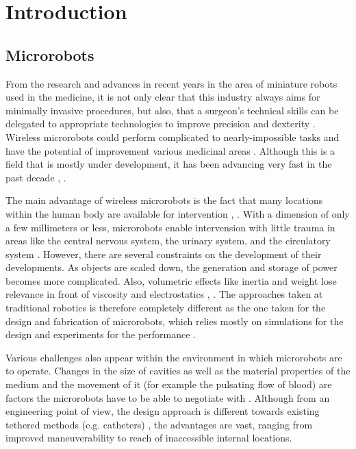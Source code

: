 \section{Introduction}
\label{s:Introduction}

\subsection{Microrobots}
From the research and advances in recent years in the area of miniature robots used in the medicine, it is not only clear that this industry always aims for minimally invasive procedures, but also, that a surgeon's technical skills can be delegated to appropriate technologies to improve precision and dexterity \cite{Hamdorf2000a}. Wireless microrobots could perform complicated to nearly-impossible tasks and have the potential of improvement various medicinal areas \cite{Nelson2010}. Although this is a field that is mostly under development, it has been advancing very fast in the past decade \cite{Joseph2005}, \cite{Nelson2010}.

The main advantage of wireless microrobots is the fact that many locations within the human body are available for intervention \cite{Kassim2006}, \cite{Menciassi2007}. With a dimension of only a few millimeters or less, microrobots enable intervension with little trauma in areas like the central nervous system, the urinary system, and the circulatory system \cite{Nelson2010}. However, there are several constraints on the development of their developments. As objects are scaled down, the generation and storage of power becomes more complicated. Also, volumetric effects like inertia and weight lose relevance in front of viscosity and electrostatics \cite{Purcell1977}, \cite{Wautelet2001}. The approaches taken at traditional robotics is therefore completely different as the one taken for  the design and fabrication of microrobots, which relies mostly on simulations for the design and experiments for the performance \cite{Nelson2010}.

Various challenges also appear within the environment in which microrobots are to operate. Changes in the size of cavities as well as the material properties of the medium and the movement of it (for example the pulsating flow of blood) are factors the microrobots have to be able to negotiate with \cite{Nelson2010}. Although from an engineering point of view, the design approach is different towards existing tethered methods (e.g. catheters) \cite{Haga2004}, the advantages are vast, ranging from improved maneuverability to reach of inaccessible internal locations.



